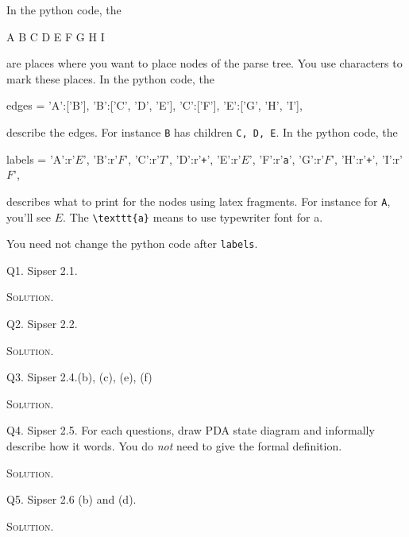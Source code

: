 In the python code, the
\begin{console}
   A
   B
C  D  E
F   G H I
\end{console}
are places where you want to place nodes of the parse tree.
You use characters to mark these places.
In the python code, the
\begin{console}
edges = {'A':['B'],
  'B':['C', 'D', 'E'],
  'C':['F'],
  'E':['G', 'H', 'I'],
  }
\end{console}
describe the edges. For instance \verb!B! has children
\verb!C, D, E!.
In the python code, the
\begin{console}
labels = {'A':r'$E$',
  'B':r'$F$',
  'C':r'$T$',
  'D':r'\texttt{+}',
  'E':r'$E$',
  'F':r'\texttt{a}',
  'G':r'$F$',
  'H':r'\texttt{+}',
  'I':r'$F$',
}
\end{console}
describes what to print for the nodes using latex fragments.
For instance for \verb!A!, you'll see $E$.
The \verb!\texttt{a}! means to use typewriter font for a.

You need not change the python code after \verb!labels!.

\newpage
Q1. Sipser 2.1. 

\textsc{Solution}.



\newpage
Q2. Sipser 2.2.

\textsc{Solution}.



\newpage
Q3. Sipser 2.4.(b), (c), (e), (f)

\textsc{Solution}.



\newpage
Q4. Sipser 2.5. For each questions, draw PDA state diagram and
informally describe how it words.
You do \textit{not} need to give the formal definition.

\textsc{Solution}.



\newpage
Q5. Sipser 2.6 (b) and (d).

\textsc{Solution}.



